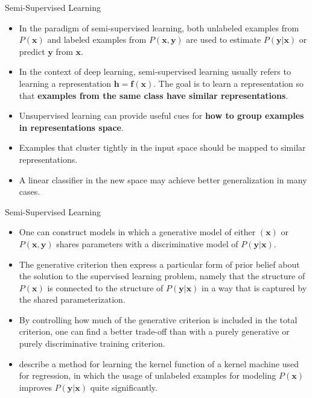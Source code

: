\documentclass[10pt]{beamer}
\begin{document}
	\begin{frame}{Semi-Supervised Learning}
		\begin{itemize}
			\item In the paradigm of semi-supervised learning, both unlabeled examples from $P(\bm{x})$ and labeled examples from $P(\bm{x},\bm{y})$ are used to estimate $P(\bm{y|\bm{x}})$ or predict $\bm{y}$ from $\bm{x}$.
			\pause
			\item In the context of deep learning, semi-supervised learning usually refers to learning a representation $\bm{h=f(\bm{x})}$. The goal is to learn a representation so that \textbf{examples from the same class have similar representations}.
			\pause
			\item Unsupervised learning can provide useful cues for \textbf{how to group examples in representations space}.
			\pause
			\item Examples that cluster tightly in the input space should be mapped to similar representations.
			\pause
			\item A linear classifier in the new space may achieve better generalization in many cases.
		\end{itemize}
	\end{frame}

	\begin{frame}{Semi-Supervised Learning}
		\begin{itemize}
			\item One can construct models in which a generative model of either $(\bm{x})$ or $P(\bm{x},\bm{y})$ shares parameters with a discriminative model of $P(\bm{y}|\bm{x})$.
			\pause
			\item The generative criterion then express a particular form of prior belief about the solution to the supervised learning problem, namely that the structure of $P(\bm{x})$ is connected to the structure of $P(\bm{y}|\bm{x})$ in a way that is captured by the shared parameterization.
			\pause
			\item By controlling how much of the generative criterion is included in the total criterion, one can find a better trade-off than with a purely generative or purely discriminative training criterion.
			\pause
			\item \citet{hinton2008using} describe a method for learning the kernel function of a kernel machine used for regression, in which the usage of unlabeled examples for modeling $P(\bm{x})$ improves $P(\bm{y}|\bm{x})$ quite significantly.
		\end{itemize}
	\end{frame}
	
\end{document}

